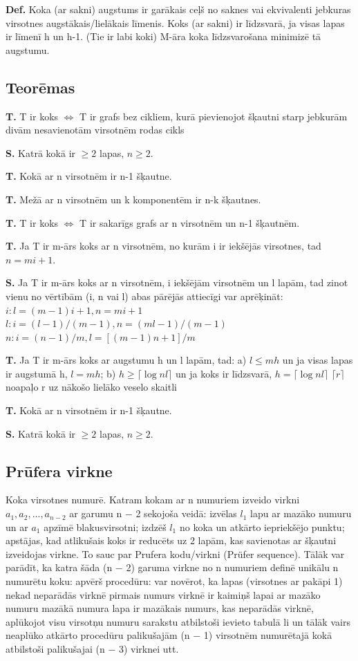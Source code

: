 \documentclass{article}
\begin{document}
\textbf{Def.}  Koka (ar sakni) augstums ir garākais ceļš no saknes vai ekvivalenti jebkuras virsotnes augstākais/lielākais līmenis.  Koks (ar sakni) ir līdzsvarā, ja visas lapas ir līmenī h un h-1. (Tie ir labi koki) M-āra koka līdzsvarošana minimizē tā augstumu.

\subsection{Teorēmas}

\textbf{T. } T ir koks $⇔$ T ir grafs bez cikliem, kurā pievienojot šķautni starp jebkurām divām
nesavienotām virsotnēm rodas cikls

\textbf{S. } Katrā kokā ir $\ge 2$ lapas, $n \ge 2$.

\textbf{T. } Kokā ar n virsotnēm ir n-1 šķautne.

\textbf{T. } Mežā ar n virsotnēm un k komponentēm ir n-k šķautnes.

\textbf{T. } T ir koks $⇔$ T ir sakarīgs grafs ar n virsotnēm un n-1 šķautnēm.

\textbf{T. } Ja T ir m-ārs koks ar n virsotnēm, no kurām i ir iekšējās virsotnes, tad $n = mi + 1$.

\textbf{S. } Ja T ir m-ārs koks ar n virsotnēm, i iekšējām virsotnēm un l lapām, tad zinot vienu no vērtībām (i, n vai l) abas pārējās attiecīgi var aprēķināt:
$i : l = (m − 1)i + 1, n = mi + 1$
$l : i = (l − 1)/(m − 1), n = (ml − 1)/(m − 1)$
$n : i = (n − 1)/m, l = [(m − 1)n + 1]/m$

\textbf{T. } Ja T ir m-ārs koks ar augstumu h un l lapām, tad: a) $l \le mh$ un ja visas lapas ir augstumā h, $l = mh$; b) $h \ge \lceil \log{n}l \rceil$ un ja koks ir līdzsvarā, $h =\lceil \log{n}l \rceil$
$\lceil r \rceil$ noapaļo r uz nākošo lielāko veselo skaitli

\textbf{T. } Kokā ar n virsotnēm ir n-1 šķautne.

\textbf{S. } Katrā kokā ir $\ge 2$ lapas, $n \ge 2$.

\subsection{Prūfera virkne}

Koka virsotnes numurē. Katram kokam ar n numuriem izveido virkni $a_1 , a_2 ,...,a_{n−2}$ ar garumu n − 2 sekojoša veidā: izvēlas $l_1$ lapu ar mazāko numuru un ar $a_1$ apzīmē blakusvirsotni; izdzēš $l_1$ no koka un atkārto iepriekšējo punktu; apstājas, kad atlikušais koks ir reducēts uz 2 lapām, kas savienotas ar šķautni izveidojas virkne. 
To sauc par Prufera kodu/virkni (Prüfer sequence).  Tālāk var parādīt, ka katra šāda (n − 2) garuma virkne no n numuriem definē unikālu n numurētu koku: apvērš procedūru: var novērot, ka lapas (virsotnes ar pakāpi 1) nekad neparādās virknē pirmais numurs virknē ir kaimiņš lapai ar mazāko numuru mazākā numura lapa ir mazākais numurs, kas neparādās virknē, aplūkojot visu virsotņu numuru sarakstu atbilstoši ievieto tabulā li un tālāk vairs neaplūko atkārto procedūru palikušajām (n − 1) virsotnēm numurētajā kokā atbilstoši palikušajai (n − 3) virknei utt.
\end{document}
